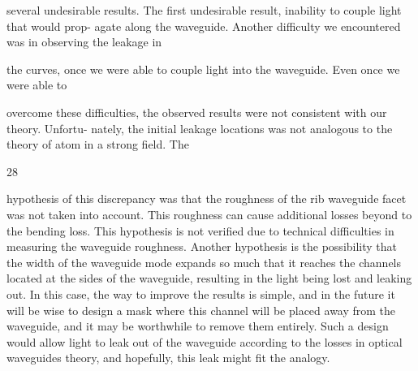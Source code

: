 \documentclass[\main/master.tex]{subfiles}
\begin{document}
several undesirable results. The first undesirable result, inability to couple light that would prop-
agate along the waveguide. Another difficulty we encountered was in observing the leakage in

the curves, once we were able to couple light into the waveguide. Even once we were able to

overcome these difficulties, the observed results were not consistent with our theory. Unfortu-
nately, the initial leakage locations was not analogous to the theory of atom in a strong field. The

28

hypothesis of this discrepancy was that the roughness of the rib waveguide facet was not taken
into account. This roughness can cause additional losses beyond to the bending loss. This
hypothesis is not verified due to technical difficulties in measuring the waveguide roughness.
Another hypothesis is the possibility that the width of the waveguide mode expands so much
that it reaches the channels located at the sides of the waveguide, resulting in the light being
lost and leaking out. In this case, the way to improve the results is simple, and in the future it
will be wise to design a mask where this channel will be placed away from the waveguide, and
it may be worthwhile to remove them entirely. Such a design would allow light to leak out of the
waveguide according to the losses in optical waveguides theory, and hopefully, this leak might
fit the analogy.
\end{document}
